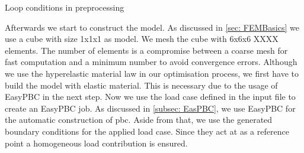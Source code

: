 \begin{table}[h!]
    \caption{Loop conditions in preprocessing}
    \label{tab:loop_conditions}
\end{table}




Afterwards we start to construct the model. As discussed in \autoref{sec: FEMBasics} we use a cube with size 1x1x1 as model. We mesh the cube with 6x6x6 XXXX elements. The number of elements is a compromise between a coarse mesh for fast computation and a minimum number to avoid convergence errors. Although we use the hyperelastic material law in our optimisation process, we first have to build the model with elastic material. This is necessary due to the usage of EasyPBC in the next step. Now we use the load case defined in the input file to create an EasyPBC job. As discussed in \autoref{subsec: EasPBC}, we use EasyPBC for the automatic construction of \acrshort{pbc}. Aside from that, we use the generated boundary conditions for the applied load case. Since they act at as a reference point a homogeneous load contribution is ensured.
